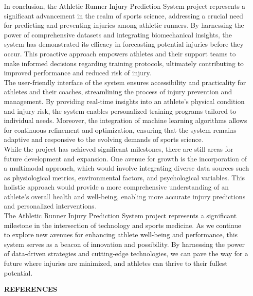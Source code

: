 \documentclass[12pt, English]{article}
\newcommand\tab[1][1cm]{\hspace*{#1}}
\begin{document}
\begin{normalsize}
\tab
In conclusion, the Athletic Runner Injury Prediction System project represents a significant advancement in the realm of sports science, addressing a crucial need for predicting and preventing injuries among athletic runners. By harnessing the power of comprehensive datasets and integrating biomechanical insights, the system has demonstrated its efficacy in forecasting potential injuries before they occur. This proactive approach empowers athletes and their support teams to make informed decisions regarding training protocols, ultimately contributing to improved performance and reduced risk of injury.\\
The user-friendly interface of the system ensures accessibility and practicality for athletes and their coaches, streamlining the process of injury prevention and management. By providing real-time insights into an athlete's physical condition and injury risk, the system enables personalized training programs tailored to individual needs. Moreover, the integration of machine learning algorithms allows for continuous refinement and optimization, ensuring that the system remains adaptive and responsive to the evolving demands of sports science.\\
While the project has achieved significant milestones, there are still areas for future development and expansion. One avenue for growth is the incorporation of a multimodal approach, which would involve integrating diverse data sources such as physiological metrics, environmental factors, and psychological variables. This holistic approach would provide a more comprehensive understanding of an athlete's overall health and well-being, enabling more accurate injury predictions and personalized interventions.\\
The Athletic Runner Injury Prediction System project represents a significant milestone in the intersection of technology and sports medicine. As we continue to explore new avenues for enhancing athlete well-being and performance, this system serves as a beacon of innovation and possibility. By harnessing the power of data-driven strategies and cutting-edge technologies, we can pave the way for a future where injuries are minimized, and athletes can thrive to their fullest potential.\\

\newpage
\begin{large}
\textbf{REFERENCES}
\end{large}

\vspace*{0.08in}
\begin{normalsize}


\end{normalsize}
\end{normalsize}
\end{document}
